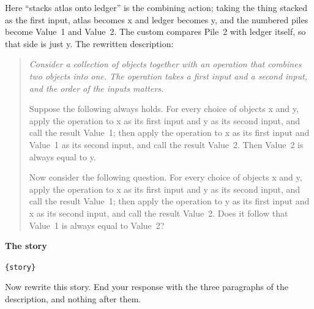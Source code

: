 \documentclass{article}
\begin{document}
\begin{promptbox}
Here ``stacks atlas onto ledger'' is the combining action; taking the thing
stacked as the first input, atlas becomes x and ledger becomes y, and the
numbered piles become Value~1 and Value~2. The custom compares Pile~2 with
ledger itself, so that side is just y. The rewritten description:
\begin{quote}\itshape
Consider a collection of objects together with an operation that combines
two objects into one. The operation takes a first input and a second
input, and the order of the inputs matters.

\medskip
Suppose the following always holds. For every choice of objects x and y,
apply the operation to x as its first input and y as its second input,
and call the result Value~1; then apply the operation to x as its first
input and Value~1 as its second input, and call the result Value~2. Then
Value~2 is always equal to y.

\medskip
Now consider the following question. For every choice of objects x and y,
apply the operation to x as its first input and y as its second input,
and call the result Value~1; then apply the operation to y as its first
input and x as its second input, and call the result Value~2. Does it
follow that Value~1 is always equal to Value~2?
\end{quote}

\vspace{0.4em}
\noindent\textbf{The story}

\texttt{\{story\}}

\medskip
Now rewrite this story. End your response with the three paragraphs of the
description, and nothing after them.

\end{promptbox}


\end{document}
